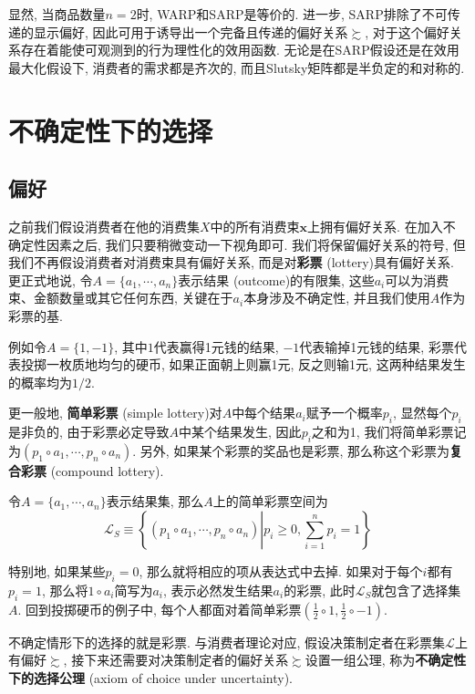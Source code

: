 \documentclass[cn, 12pt, math=mtpro2, bibstyle=apa, blue]{elegantbook}
\newcommand{\x}{\mathbf{x}}
\begin{document}
显然, 当商品数量$n=2$时, WARP和SARP是等价的. 进一步, SARP排除了不可传递的显示偏好, 因此可用于诱导出一个完备且传递的偏好关系$\succsim$, 对于这个偏好关系存在着能使可观测到的行为理性化的效用函数. 无论是在SARP假设还是在效用最大化假设下, 消费者的需求都是齐次的, 而且Slutsky矩阵都是半负定的和对称的.

\section{不确定性下的选择}
\subsection{偏好}
之前我们假设消费者在他的消费集$X$中的所有消费束$\x$上拥有偏好关系. 在加入不确定性因素之后, 我们只要稍微变动一下视角即可. 我们将保留偏好关系的符号, 但我们不再假设消费者对消费束具有偏好关系, 而是对\textbf{彩票} (lottery)具有偏好关系. 更正式地说, 令$A=\{a_1,\cdots,a_n\}$表示结果 (outcome)的有限集, 这些$a_i$可以为消费束、金额数量或其它任何东西, 关键在于$a_i$本身涉及不确定性, 并且我们使用$A$作为彩票的基.

例如令$A=\{1,-1\}$, 其中$1$代表赢得1元钱的结果, $-1$代表输掉1元钱的结果, 彩票代表投掷一枚质地均匀的硬币, 如果正面朝上则赢1元, 反之则输1元, 这两种结果发生的概率均为$1/2$.

更一般地, \textbf{简单彩票} (simple lottery)对$A$中每个结果$a_i$赋予一个概率$p_i$, 显然每个$p_i$是非负的, 由于彩票必定导致$A$中某个结果发生, 因此$p_i$之和为1, 我们将简单彩票记为$(p_1\circ a_1,\cdots,p_n\circ a_n)$. 另外, 如果某个彩票的奖品也是彩票, 那么称这个彩票为\textbf{复合彩票} (compound lottery).

\begin{definition}[简单彩票]\label{def:def2.1}
令$A=\{a_1,\cdots,a_n\}$表示结果集, 那么$A$上的简单彩票空间为
$$\mathscr{L}_S\equiv\left\{(p_1\circ a_1,\cdots,p_n\circ a_n)\left|p_i\ge0, \sum_{i=1}^{n}p_i=1\right.\right\}$$
\end{definition}
特别地, 如果某些$p_i=0$, 那么就将相应的项从表达式中去掉. 如果对于每个$i$都有$p_i=1$, 那么将$1\circ a_i$简写为$a_i$, 表示必然发生结果$a_i$的彩票, 此时$\mathscr{L}_S$就包含了选择集$A$. 回到投掷硬币的例子中, 每个人都面对着简单彩票$(\frac{1}{2}\circ 1, \frac{1}{2}\circ -1)$.

不确定情形下的选择的就是彩票. 与消费者理论对应, 假设决策制定者在彩票集$\mathscr{L}$上有偏好$\succsim$, 接下来还需要对决策制定者的偏好关系$\succsim$设置一组公理, 称为\textbf{不确定性下的选择公理} (axiom of choice under uncertainty).
\end{document}

